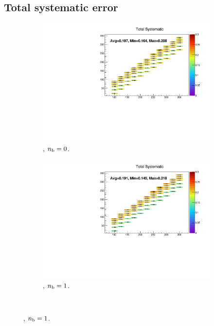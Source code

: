 \newpage
\subsection*{Total systematic error}

\begin{figure}[h!]
  \centering
  \begin{subfigure}[b]{0.47\textwidth}
    \includegraphics[width=\textwidth]{Figs/sms/t2cc/v37_3/systs/total_T2cc_eq0b_le3j_incl.pdf}
    \caption{\njlow, $n_{\text{b}} = 0$.}
  \end{subfigure}
  \begin{subfigure}[b]{0.47\textwidth}
    \includegraphics[width=\textwidth]{Figs/sms/t2cc/v37_3/systs/total_T2cc_eq1b_le3j_incl.pdf}
    \caption{\njlow, $n_{\text{b}} = 1$.}
  \end{subfigure}\\

\end{figure}
